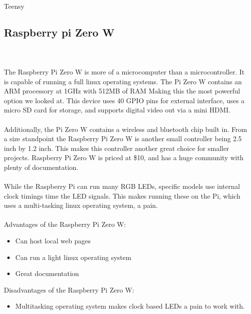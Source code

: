 Teensy\documentclass[onecolumn, draftclsnofoot,10pt, compsoc]{IEEEtran}
\begin{document}
		\subsection{Raspberry pi Zero W}
		\\\\
		The Raspberry Pi Zero W is more of a microcomputer than a microcontroller.
		It is capable of running a full linux operating systems. The Pi Zero W
		contains an ARM processory at 1GHz with 512MB of RAM Making this the most
		powerful option we looked at. This device uses 40 GPIO pins for
		external interface, uses a micro SD card for storage, and supports digital
		video out via a mini HDMI\cite[Pg 2]{pizero}.
		\\\\
		Additionally, the Pi Zero W contains a wireless and bluetooth chip built in.
		From a size standpoint the Raspberry Pi Zero W is another small controller
		being 2.5 inch by 1.2 inch. This makes this controller another great choice
		for smaller projects. Raspberry Pi Zero W is priced at \$10, and has a huge
		community with plenty of documentation.
		\\\\
		While the Raspberry Pi can run many RGB LEDs, specific models use internal
		clock timings time the LED signals. This makes running these on the Pi,
		which uses a multi-tasking linux operating system, a pain.
		\\\\
		Advantages of the Raspberry Pi Zero W:
		\begin{itemize}
			\item Can host local web pages
			\item Can run a light linux operating system
			\item Great documentation
		\end{itemize}
		Disadvantages of the Raspberry Pi Zero W:
		\begin{itemize}
			\item Multitasking operating system makes clock based LEDs a pain to
			work with.
		\end{itemize}
\end{document}
